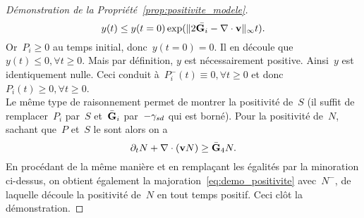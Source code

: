 \documentclass[main.tex]{subfiles}
\begin{document}
\begin{proof}[Démonstration de la Propriété~\ref{prop:positivite_modele}]
\begin{equation}
y(t) \leq y(t=0) \exp ( \| 2\bar{{\bf G}_i} - \nabla\cdot \mathbf{v} \|_{\infty} t  ).
\end{equation}
Or~$P_i\geq 0$ au temps initial, donc~$y(t=0)=0$. Il en découle que~$y(t)\leq0, \forall t\geq0$. Mais par définition, $y$ est nécessairement positive. Ainsi~$y$ est identiquement nulle. Ceci conduit à~$P_i^-(t)\equiv0, \forall t\geq0$ et donc $P_i(t)\geq0, \forall t\geq0$. \\
Le même type de raisonnement permet de montrer la positivité de~$S$ (il suffit de remplacer~$P_i$ par~$S$ et~$\bar{{\bf G}}_i$ par~$-\gamma_{sd}$ qui est borné). Pour la positivité de~$N$, sachant que~$P$ et~$S$ le sont alors on a
$$ \partial_t N + \nabla\cdot (\mathbf{v} N) \geq \bar{{\bf G}}_4 N.$$
En procédant de la même manière et en remplaçant les égalités par la minoration ci-dessus, on obtient également la majoration~\eqref{eq:demo_positivite} avec~$N^-$, de laquelle découle la positivité de~$N$ en tout temps positif. Ceci clôt la démonstration.
\end{proof}
\end{document}
